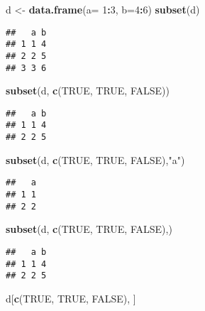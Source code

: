 \documentclass[
]{article}
\newenvironment{Shaded}{\begin{snugshade}}{\end{snugshade}}
\newcommand{\DataTypeTok}[1]{\textcolor[rgb]{0.13,0.29,0.53}{#1}}
\newcommand{\DecValTok}[1]{\textcolor[rgb]{0.00,0.00,0.81}{#1}}
\newcommand{\KeywordTok}[1]{\textcolor[rgb]{0.13,0.29,0.53}{\textbf{#1}}}
\newcommand{\NormalTok}[1]{#1}
\newcommand{\OperatorTok}[1]{\textcolor[rgb]{0.81,0.36,0.00}{\textbf{#1}}}
\newcommand{\OtherTok}[1]{\textcolor[rgb]{0.56,0.35,0.01}{#1}}
\newcommand{\StringTok}[1]{\textcolor[rgb]{0.31,0.60,0.02}{#1}}
\begin{document}
\begin{Shaded}
\begin{Highlighting}[]
\NormalTok{d <-}\StringTok{ }\KeywordTok{data.frame}\NormalTok{(}\DataTypeTok{a=} \DecValTok{1}\OperatorTok{:}\DecValTok{3}\NormalTok{, }\DataTypeTok{b=}\DecValTok{4}\OperatorTok{:}\DecValTok{6}\NormalTok{)}
\KeywordTok{subset}\NormalTok{(d)}
\end{Highlighting}
\end{Shaded}

\begin{verbatim}
##   a b
## 1 1 4
## 2 2 5
## 3 3 6
\end{verbatim}

\begin{Shaded}
\begin{Highlighting}[]
\KeywordTok{subset}\NormalTok{(d, }\KeywordTok{c}\NormalTok{(}\OtherTok{TRUE}\NormalTok{, }\OtherTok{TRUE}\NormalTok{, }\OtherTok{FALSE}\NormalTok{))}
\end{Highlighting}
\end{Shaded}

\begin{verbatim}
##   a b
## 1 1 4
## 2 2 5
\end{verbatim}

\begin{Shaded}
\begin{Highlighting}[]
\KeywordTok{subset}\NormalTok{(d, }\KeywordTok{c}\NormalTok{(}\OtherTok{TRUE}\NormalTok{, }\OtherTok{TRUE}\NormalTok{, }\OtherTok{FALSE}\NormalTok{),}\StringTok{"a"}\NormalTok{)}
\end{Highlighting}
\end{Shaded}

\begin{verbatim}
##   a
## 1 1
## 2 2
\end{verbatim}

\begin{Shaded}
\begin{Highlighting}[]
\KeywordTok{subset}\NormalTok{(d, }\KeywordTok{c}\NormalTok{(}\OtherTok{TRUE}\NormalTok{, }\OtherTok{TRUE}\NormalTok{, }\OtherTok{FALSE}\NormalTok{),)}
\end{Highlighting}
\end{Shaded}

\begin{verbatim}
##   a b
## 1 1 4
## 2 2 5
\end{verbatim}

\begin{Shaded}
\begin{Highlighting}[]
\NormalTok{d[}\KeywordTok{c}\NormalTok{(}\OtherTok{TRUE}\NormalTok{, }\OtherTok{TRUE}\NormalTok{, }\OtherTok{FALSE}\NormalTok{), ]}
\end{Highlighting}
\end{Shaded}
\end{document}
